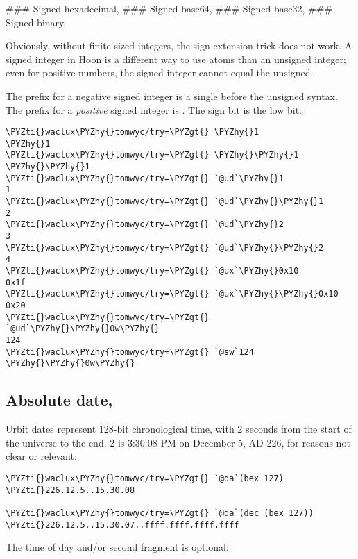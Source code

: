 \#\#\# Signed hexadecimal, 
\#\#\# Signed base64, 
\#\#\# Signed base32, 
\#\#\# Signed binary, 

Obviously, without finite-sized integers, the sign extension
trick does not work.  A signed integer in Hoon is a different way
to use atoms than an unsigned integer; even for positive numbers,
the signed integer cannot equal the unsigned.

The prefix for a negative signed integer is a single \kode{-} before
the unsigned syntax.  The prefix for a \emph{positive} signed integer
is \kode{--}.  The sign bit is the low bit:  

\begin{framed_shaded}
\begin{Verbatim}[fontsize=\relsize{-2.5},fontseries=b,commandchars=\\\{\}]
\PYZti{}waclux\PYZhy{}tomwyc/try=\PYZgt{} \PYZhy{}1
\PYZhy{}1
\PYZti{}waclux\PYZhy{}tomwyc/try=\PYZgt{} \PYZhy{}\PYZhy{}1
\PYZhy{}\PYZhy{}1
\PYZti{}waclux\PYZhy{}tomwyc/try=\PYZgt{} `@ud`\PYZhy{}1
1
\PYZti{}waclux\PYZhy{}tomwyc/try=\PYZgt{} `@ud`\PYZhy{}\PYZhy{}1
2
\PYZti{}waclux\PYZhy{}tomwyc/try=\PYZgt{} `@ud`\PYZhy{}2
3
\PYZti{}waclux\PYZhy{}tomwyc/try=\PYZgt{} `@ud`\PYZhy{}\PYZhy{}2
4
\PYZti{}waclux\PYZhy{}tomwyc/try=\PYZgt{} `@ux`\PYZhy{}0x10
0x1f
\PYZti{}waclux\PYZhy{}tomwyc/try=\PYZgt{} `@ux`\PYZhy{}\PYZhy{}0x10
0x20
\PYZti{}waclux\PYZhy{}tomwyc/try=\PYZgt{} `@ud`\PYZhy{}\PYZhy{}0w\PYZhy{}
124
\PYZti{}waclux\PYZhy{}tomwyc/try=\PYZgt{} `@sw`124
\PYZhy{}\PYZhy{}0w\PYZhy{}
\end{Verbatim}
\end{framed_shaded}

\subsection{Absolute date, }

Urbit dates represent 128-bit chronological time, with 2
seconds from the start of the universe to the end.  2 is
3:30:08 PM on December 5, AD 226, for reasons not clear or relevant:

\begin{framed_shaded}
\begin{Verbatim}[fontsize=\relsize{-2.5},fontseries=b,commandchars=\\\{\}]
\PYZti{}waclux\PYZhy{}tomwyc/try=\PYZgt{} `@da`(bex 127)
\PYZti{}226.12.5..15.30.08

\PYZti{}waclux\PYZhy{}tomwyc/try=\PYZgt{} `@da`(dec (bex 127))
\PYZti{}226.12.5..15.30.07..ffff.ffff.ffff.ffff
\end{Verbatim}
\end{framed_shaded}
The time of day and/or second fragment is optional:

